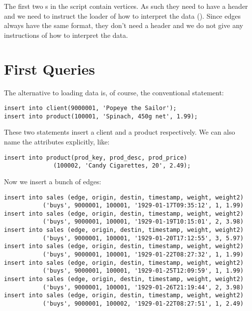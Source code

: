 The first two s in the script contain vertices.
As such they need to have a header and we need to instruct
the loader of how to interpret the data ().
Since edges always have the same format, they don't need a header
and we do not give any instructions of how to interpret the data.

\section{First Queries}
The alternative to loading data is, of course, the conventional
 statement:

\begin{sqlcode}
\begin{lstlisting}
insert into client(9000001, 'Popeye the Sailor');
insert into product(100001, 'Spinach, 450g net', 1.99);
\end{lstlisting}
\end{sqlcode}

These two statements insert a client and a product respectively.
We can also name the attributes explicitly, like:

\begin{sqlcode}
\begin{lstlisting}
insert into product(prod_key, prod_desc, prod_price)
              (100002, 'Candy Cigarettes, 20', 2.49);
\end{lstlisting}
\end{sqlcode}

Now we insert a bunch of edges:

\begin{sqlcode}
\begin{lstlisting}
insert into sales (edge, origin, destin, timestamp, weight, weight2)
           ('buys', 9000001, 100001, '1929-01-17T09:35:12', 1, 1.99)
insert into sales (edge, origin, destin, timestamp, weight, weight2)
           ('buys', 9000001, 100001, '1929-01-19T10:15:01', 2, 3.98)
insert into sales (edge, origin, destin, timestamp, weight, weight2)
           ('buys', 9000001, 100001, '1929-01-20T17:12:55', 3, 5.97)
insert into sales (edge, origin, destin, timestamp, weight, weight2)
           ('buys', 9000001, 100001, '1929-01-22T08:27:32', 1, 1.99)
insert into sales (edge, origin, destin, timestamp, weight, weight2)
           ('buys', 9000001, 100001, '1929-01-25T12:09:59', 1, 1.99)
insert into sales (edge, origin, destin, timestamp, weight, weight2)
           ('buys', 9000001, 100001, '1929-01-26T21:19:44', 2, 3.98)
insert into sales (edge, origin, destin, timestamp, weight, weight2)
           ('buys', 9000001, 100002, '1929-01-22T08:27:51', 1, 2.49)
\end{lstlisting}
\end{sqlcode}

